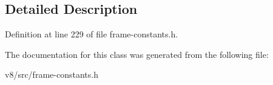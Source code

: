 \subsection{Detailed Description}


Definition at line 229 of file frame-\/constants.\+h.



The documentation for this class was generated from the following file\+:\begin{DoxyCompactItemize}
\item 
v8/src/frame-\/constants.\+h\end{DoxyCompactItemize}

